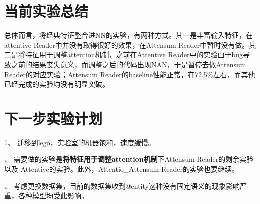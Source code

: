 \documentclass[11pt]{article}
\begin{document}
\section{当前实验总结}
总体而言，将经典特征整合进NN的实验，有两种方式。其一是丰富输入特征，在attentive Reader中并没有取得很好的效果，在Attensum Reader中暂时没有做。其二是将特征用于调整attention机制，之前在Attentive Reader中的实验由于bug导致之前的结果丧失意义，而调整之后的代码出现NAN，于是暂停去做Attensum Reader的对应实验；Attensum Reader的baseline性能正常，在72.5\%左右，而其他已经完成的实验均没有明显突破。

\section{下一步实验计划}
1、 迁移到lego，实验室的机器饱和，速度缓慢。

、 需要做的实验是{\bf 将特征用于调整attention机制}下Attensum Reader的剩余实验 以及  Attentive的实验。此外，Attentio\_Attensum Reader的实验也要继续。

、 考虑更换数据集，目前的数据集收到@entity这种没有固定语义的现象影响严重，各种模型均受此影响。
 
\end{document}

